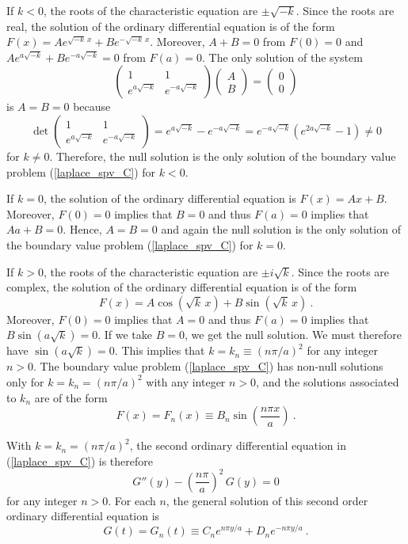 \begin{egg}
If $k<0$, the roots of the characteristic equation are $\pm \sqrt{-k}$.
Since the roots are real, the solution of the ordinary differential
equation is of the form
$\displaystyle F(x) = A e^{\sqrt{-k}\,x} + B e^{-\sqrt{-k}\, x}$.
Moreover, $A+B=0$ from $F(0)=0$ and 
$\displaystyle A e^{a\sqrt{-k}} + B e^{-a\sqrt{-k}} = 0$ from $F(a)=0$.
The only solution of the system
\[
\begin{pmatrix}
1 & 1 \\ e^{a\sqrt{-k}} & e^{-a\sqrt{-k}}
\end{pmatrix}
\begin{pmatrix}
A \\ B
\end{pmatrix}
=
\begin{pmatrix}
0 \\ 0 
\end{pmatrix}
\]
is $A=B=0$ because
\[
\det
\begin{pmatrix}
1 & 1 \\ e^{a\sqrt{-k}} & e^{-a\sqrt{-k}}
\end{pmatrix}
= e^{a\sqrt{-k}} - e^{-a\sqrt{-k}} =
e^{-a\sqrt{-k}}\left(e^{2a\sqrt{-k}} - 1 \right)  
\neq 0
\]
for $k\neq 0$.  Therefore, the null solution is the only solution
of the boundary value problem (\ref{laplace_spv_C}) for $k<0$.

If $k=0$, the solution of the ordinary differential equation is $F(x)=Ax+B$.
Moreover, $F(0)=0$ implies that $B=0$ and thus $F(a)=0$ implies
that $Aa + B = 0$.  Hence, $A=B=0$ and again the null solution is the
only solution of the boundary value problem (\ref{laplace_spv_C}) for
$k=0$.

If $k>0$, the roots of the characteristic equation are $\pm i \sqrt{k}$.
Since the roots are complex, the solution of the ordinary differential
equation is of the form
\[
F(x) = A \cos\left(\sqrt{k}\,x\right) + B \sin\left(\sqrt{k}\,x\right) \ .
\]
Moreover, $F(0)=0$ implies that $A=0$ and thus $F(a)=0$ implies that
$B \sin\left(a\sqrt{k}\right) = 0$.  If we take $B=0$, we get the
null solution.  We must therefore have
$\sin\left(a\sqrt{k}\right) = 0$.  This implies that
$\displaystyle k = k_n \equiv \left(n\pi/a\right)^2$ for any integer $n>0$.
The boundary value problem
(\ref{laplace_spv_C}) has non-null solutions only for
$\displaystyle k = k_n = \left(n\pi/a\right)^2$ with
any integer $n>0$, and the solutions associated to $k_n$ are of the
form
\[
F(x)=F_n(x) \equiv B_n \sin\left(\frac{n\pi x}{a}\right) \ .
\]

With $\displaystyle k = k_n = \left(n\pi/a\right)^2$, the second
ordinary differential equation in (\ref{laplace_spv_C}) is therefore
\[
G''(y) - \left(\frac{n\pi}{a}\right)^2\,G(y) = 0
\]
for any integer $n>0$.  For each $n$, the general solution
of this second order ordinary differential equation is
\[
G(t) = G_n(t) \equiv C_n e^{n\pi y/a} + D_n e^{-n\pi y/a} \ .
\]


\end{egg}
